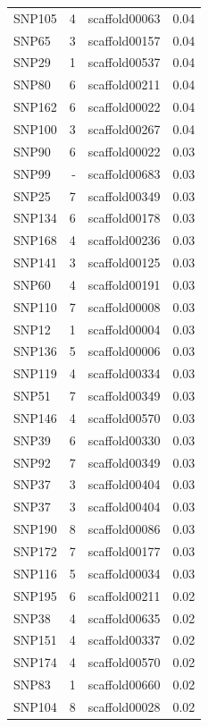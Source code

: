 \begin{longtable}{lrlr}
  SNP105 &   4 & scaffold00063 & 0.04 \\ 
  SNP65 &   3 & scaffold00157 & 0.04 \\ 
  SNP29 &   1 & scaffold00537 & 0.04 \\ 
  SNP80 &   6 & scaffold00211 & 0.04 \\ 
  SNP162 &   6 & scaffold00022 & 0.04 \\ 
  SNP100 &   3 & scaffold00267 & 0.04 \\ 
  SNP90 &   6 & scaffold00022 & 0.03 \\ 
  SNP99 & - & scaffold00683 & 0.03 \\ 
  SNP25 &   7 & scaffold00349 & 0.03 \\ 
  SNP134 &   6 & scaffold00178 & 0.03 \\ 
  SNP168 &   4 & scaffold00236 & 0.03 \\ 
  SNP141 &   3 & scaffold00125 & 0.03 \\ 
  SNP60 &   4 & scaffold00191 & 0.03 \\ 
  SNP110 &   7 & scaffold00008 & 0.03 \\ 
  SNP12 &   1 & scaffold00004 & 0.03 \\ 
  SNP136 &   5 & scaffold00006 & 0.03 \\ 
  SNP119 &   4 & scaffold00334 & 0.03 \\ 
  SNP51 &   7 & scaffold00349 & 0.03 \\ 
  SNP146 &   4 & scaffold00570 & 0.03 \\ 
  SNP39 &   6 & scaffold00330 & 0.03 \\ 
  SNP92 &   7 & scaffold00349 & 0.03 \\ 
  SNP37 &   3 & scaffold00404 & 0.03 \\ 
  SNP37 &   3 & scaffold00404 & 0.03 \\ 
  SNP190 &   8 & scaffold00086 & 0.03 \\ 
  SNP172 &   7 & scaffold00177 & 0.03 \\ 
  SNP116 &   5 & scaffold00034 & 0.03 \\ 
  SNP195 &   6 & scaffold00211 & 0.02 \\ 
  SNP38 &   4 & scaffold00635 & 0.02 \\ 
  SNP151 &   4 & scaffold00337 & 0.02 \\ 
  SNP174 &   4 & scaffold00570 & 0.02 \\ 
  SNP83 &   1 & scaffold00660 & 0.02 \\ 
  SNP104 &   8 & scaffold00028 & 0.02 \\ 

\end{longtable}

